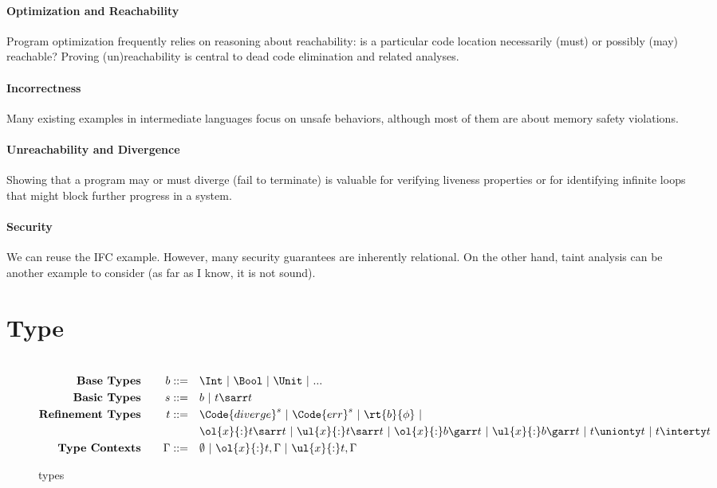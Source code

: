\paragraph{Optimization and Reachability} Program optimization frequently relies on reasoning about reachability: is a particular code location necessarily (must) or possibly (may) reachable? Proving (un)reachability is central to dead code elimination and related analyses.

\paragraph{Incorrectness} Many existing examples in intermediate languages focus on unsafe behaviors, although most of them are about memory safety violations.

\paragraph{Unreachability and Divergence} Showing that a program may or must diverge (fail to terminate) is valuable for verifying liveness properties or for identifying infinite loops that might block further progress in a system.

\paragraph{Security} We can reuse the IFC example. However, many security guarantees are inherently relational. On the other hand, taint analysis can be another example to consider (as far as I know, it is not sound).

\section{Type}

\newcommand{\divergeTy}[1]{\Code{diverge}^{#1}}
\newcommand{\errTy}[1]{\Code{err}^{#1}}

\begin{figure}[t!]
    {\small
    \begin{alignat*}{2}
        \\\text{\textbf{Base Types}}& \quad & b  ::= \quad & \Int ~|~ \Bool ~|~ \Unit ~|~ ...
        \\\text{\textbf{Basic Types}}& \quad & s  ::= \quad & b ~|~ t \sarr t
        \\\text{\textbf{Refinement Types}}& \quad & t  ::= \quad & \divergeTy{s} ~|~ \errTy{s} ~|~ \rt{b}{\phi} ~|~
        \\ & \quad & \quad & \ol{x}{:}t\sarr t ~|~ \ul{x}{:}t\sarr t ~|~ \ol{x}{:}b\garr t ~|~ \ul{x}{:}b\garr t ~|~ t \unionty t ~|~ t \interty t
        \\\text{\textbf{Type Contexts}}& \quad &\Gamma ::= \quad  &\emptyset ~|~ \ol{x}{:}t, \Gamma ~|~ \ul{x}{:}t, \Gamma
      \end{alignat*}
    }
    \vspace*{-.15in}
    \caption{\DSL{} types}
    \label{fig:type-syntax}
    \vspace*{-.15in}
    \end{figure}

